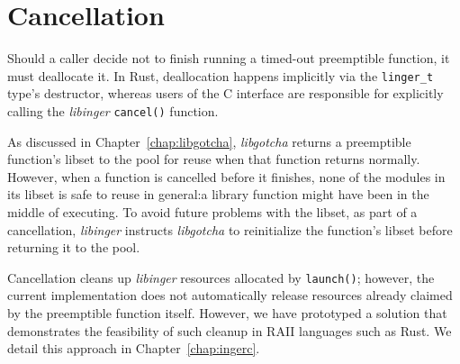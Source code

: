 


\begin{promotesubsections}









\end{promotesubsections}




\section{Cancellation}

Should a caller decide not to finish running a timed-out preemptible function, it
must deallocate it.  In Rust, deallocation happens implicitly via the
\texttt{linger\_t} type's destructor, whereas users of the C interface are responsible
for explicitly calling the \textit{libinger} \texttt{cancel()} function.

As discussed in Chapter~\ref{chap:libgotcha}, \textit{libgotcha} returns a
preemptible function's libset to the pool for reuse when that function returns
normally.  However, when a function is cancelled before it finishes, none of the
modules in its libset is safe to reuse in general:\@ a library function might have
been in the middle of executing.  To avoid future problems with the libset, as part
of a cancellation, \textit{libinger} instructs \textit{libgotcha} to reinitialize the
function's libset before returning it to the pool.

Cancellation cleans up \textit{libinger} resources allocated by \texttt{launch()};
however, the current implementation does not automatically release resources already
claimed by the preemptible function itself.  However, we have prototyped a solution
that demonstrates the feasibility of such cleanup in RAII languages such as Rust.
We detail this approach in Chapter~\ref{chap:ingerc}.


